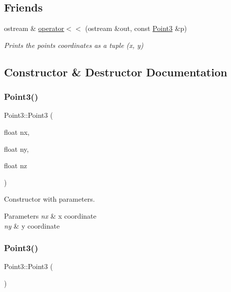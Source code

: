 \subsection*{Friends}
\begin{DoxyCompactItemize}
\item 
ostream \& \mbox{\hyperlink{class_point3_ab58e7c0107133aba26fee83dcbff5764}{operator$<$$<$}} (ostream \&out, const \mbox{\hyperlink{class_point3}{Point3}} \&p)
\begin{DoxyCompactList}\small\item\em Prints the point\textquotesingle{}s coordinates as a tuple (x, y) \end{DoxyCompactList}\end{DoxyCompactItemize}


\subsection{Constructor \& Destructor Documentation}
\mbox{\label{class_point3_a10d1874b1185837440a6a21d65b6cfbb}} 
\subsubsection{\texorpdfstring{Point3()}{Point3()}\hspace{0.1cm}{\footnotesize\ttfamily [1/2]}}
{\footnotesize\ttfamily Point3\+::\+Point3 (\begin{DoxyParamCaption}\item[{float}]{nx,  }\item[{float}]{ny,  }\item[{float}]{nz }\end{DoxyParamCaption})}



Constructor with parameters. 


\begin{DoxyParams}{Parameters}
{\em nx} & x coordinate \\
\hline
{\em ny} & y coordinate \\
\hline
\end{DoxyParams}
\mbox{\label{class_point3_a9a22451b2dd7f2b26ad5a3e9b74c8eca}} 
\subsubsection{\texorpdfstring{Point3()}{Point3()}\hspace{0.1cm}{\footnotesize\ttfamily [2/2]}}
{\footnotesize\ttfamily Point3\+::\+Point3 (\begin{DoxyParamCaption}{ }\end{DoxyParamCaption})}




